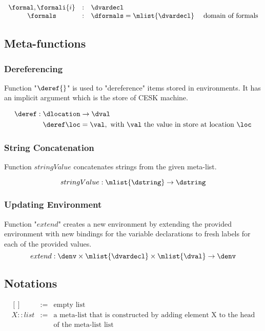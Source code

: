 \documentclass{article}
\begin{document}
\[
  \begin{array}{ccll}
	\formal, \formali{i} & : & \dvardecl\\
	\formals & : & \dformals = \mlist{\dvardecl} &\textrm{ domain of formals}\\

  \end{array}
\]
\subsection{Meta-functions}
\label{subsec:meta-functions}
\subsubsection{Dereferencing}
\label{subsubsection:dereferecing}
Function "$\deref{}$" is used to "dereference" items stored in environments. It has an implicit argument which is the store of CESK machine.

\begin{align*}
  \deref : \dlocation &\rightarrow \dval \\
  \deref\loc &=  \val, \textrm{ with $\val$ the value in store at location } \loc
\end{align*}

\subsubsection{String Concatenation}
\label{subsubsec:string-concatenation}
Function $stringValue$ concatenates strings from the given meta-list.

\[stringValue : \mlist{\dstring} \rightarrow \dstring\]

\subsubsection{Updating Environment}
\label{subsubsec:updating-env}
Function "$extend$" creates a new environment by extending the provided environment with new bindings for the variable declarations to fresh labels for each of the provided values.
\[extend : \denv \times \mlist{\dvardecl} \times \mlist{\dval} \rightarrow  \denv \]

\subsection{Notations}
\label{subsec:notations}

\[
  \begin{array}{lcl}
    [] &:=& \textrm{empty list}\\
    X :: list &:=& \textrm{a meta-list that is constructed by adding element X to the head}\\
    && \textrm{of the meta-list list}
  \end{array}
\]
\end{document}

